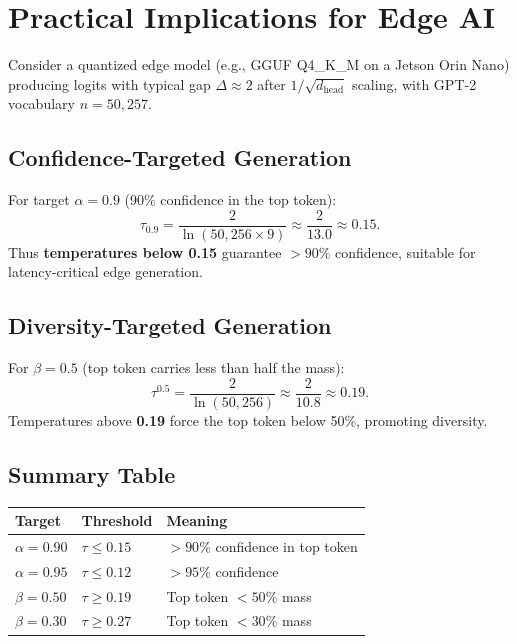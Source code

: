 \documentclass[11pt,a4paper]{article}
\theoremstyle{definition}
\newcommand{\temp}{\tau}
\newcommand{\gap}{\Delta}
\begin{document}
\section{Practical Implications for Edge AI}

Consider a quantized edge model (e.g., GGUF Q4\_K\_M on a Jetson Orin Nano) producing logits with typical gap $\gap \approx 2$ after $1/\sqrt{d_{\text{head}}}$ scaling, with GPT-2 vocabulary $n = 50{,}257$.

\subsection{Confidence-Targeted Generation}

For target $\alpha = 0.9$ (90\% confidence in the top token):
\[
  \temp_{0.9} = \frac{2}{\ln(50{,}256 \times 9)} \approx \frac{2}{13.0} \approx 0.15.
\]
Thus \textbf{temperatures below 0.15} guarantee $>90\%$ confidence, suitable for latency-critical edge generation.

\subsection{Diversity-Targeted Generation}

For $\beta = 0.5$ (top token carries less than half the mass):
\[
  \temp^{0.5} = \frac{2}{\ln(50{,}256)} \approx \frac{2}{10.8} \approx 0.19.
\]
Temperatures above \textbf{0.19} force the top token below 50\%, promoting diversity.

\subsection{Summary Table}

\begin{center}
\begin{tabular}{@{}lll@{}}
\toprule
\textbf{Target} & \textbf{Threshold} & \textbf{Meaning} \\
\midrule
$\alpha = 0.90$ & $\temp \leq 0.15$ & $>90\%$ confidence in top token \\
$\alpha = 0.95$ & $\temp \leq 0.12$ & $>95\%$ confidence \\
$\beta = 0.50$ & $\temp \geq 0.19$ & Top token $<50\%$ mass \\
$\beta = 0.30$ & $\temp \geq 0.27$ & Top token $<30\%$ mass \\
\bottomrule
\end{tabular}
\end{center}
\end{document}
